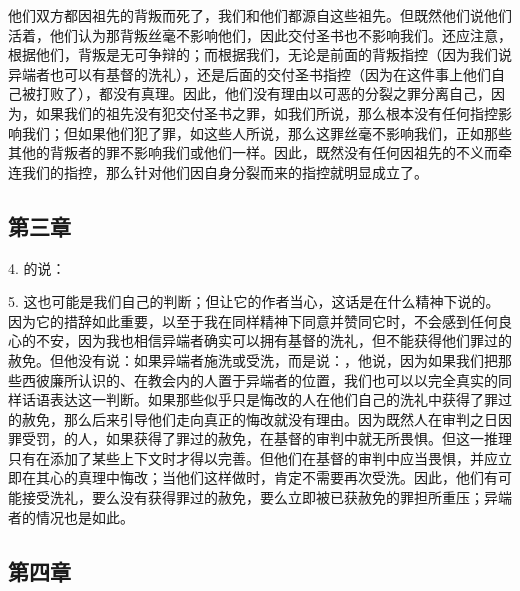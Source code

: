他们双方都因祖先的背叛而死了，我们和他们都源自这些祖先。但既然他们说他们活着，他们认为那背叛丝毫不影响他们，因此交付圣书也不影响我们。还应注意，根据他们，背叛是无可争辩的；而根据我们，无论是前面的背叛指控（因为我们说异端者也可以有基督的洗礼），还是后面的交付圣书指控（因为在这件事上他们自己被打败了），都没有真理。因此，他们没有理由以可恶的分裂之罪分离自己，因为，如果我们的祖先没有犯交付圣书之罪，如我们所说，那么根本没有任何指控影响我们；但如果他们犯了罪，如这些人所说，那么这罪丝毫不影响我们，正如那些其他的背叛者的罪不影响我们或他们一样。因此，既然没有任何因祖先的不义而牵连我们的指控，那么针对他们因自身分裂而来的指控就明显成立了。\par


\subsection{第三章}

4. 的说：\par

5. 这也可能是我们自己的判断；但让它的作者当心，这话是在什么精神下说的。因为它的措辞如此重要，以至于我在同样精神下同意并赞同它时，不会感到任何良心的不安，因为我也相信异端者确实可以拥有基督的洗礼，但不能获得他们罪过的赦免。但他没有说：如果异端者施洗或受洗，而是说：，他说，因为如果我们把那些西彼廉所认识的、在教会内的人置于异端者的位置，我们也可以以完全真实的同样话语表达这一判断。如果那些似乎只是悔改的人在他们自己的洗礼中获得了罪过的赦免，那么后来引导他们走向真正的悔改就没有理由。因为既然人在审判之日因罪受罚，的人，如果获得了罪过的赦免，在基督的审判中就无所畏惧。但这一推理只有在添加了某些上下文时才得以完善。但他们在基督的审判中应当畏惧，并应立即在其心的真理中悔改；当他们这样做时，肯定不需要再次受洗。因此，他们有可能接受洗礼，要么没有获得罪过的赦免，要么立即被已获赦免的罪担所重压；异端者的情况也是如此。\par


\subsection{第四章}


